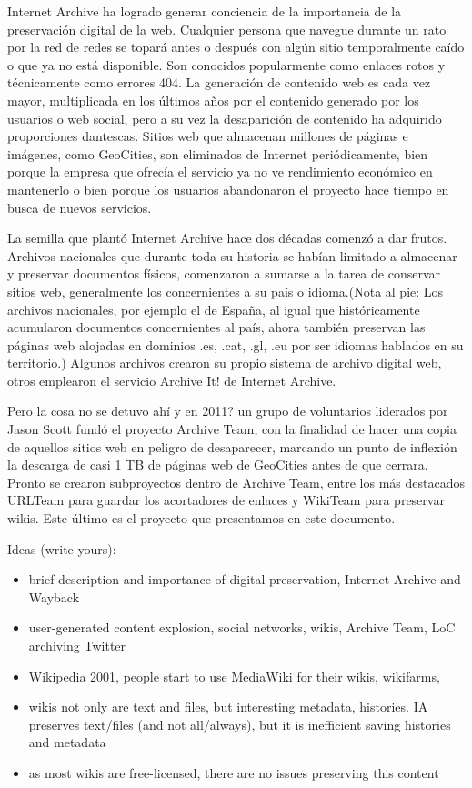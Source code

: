 \documentclass[11pt,twocolumn]{article}
\begin{document}
Internet Archive ha logrado generar conciencia de la importancia de la preservación digital de la web. Cualquier persona que navegue durante un rato por la red de redes se topará antes o después con algún sitio temporalmente caído o que ya no está disponible. Son conocidos popularmente como enlaces rotos y técnicamente como errores 404. La generación de contenido web es cada vez mayor, multiplicada en los últimos años por el contenido generado por los usuarios o web social, pero a su vez la desaparición de contenido ha adquirido proporciones dantescas. Sitios web que almacenan millones de páginas e imágenes, como GeoCities, son eliminados de Internet periódicamente, bien porque la empresa que ofrecía el servicio ya no ve rendimiento económico en mantenerlo o bien porque los usuarios abandonaron el proyecto hace tiempo en busca de nuevos servicios.

La semilla que plantó Internet Archive hace dos décadas comenzó a dar frutos. Archivos nacionales que durante toda su historia se habían limitado a almacenar y preservar documentos físicos, comenzaron a sumarse a la tarea de conservar sitios web, generalmente los concernientes a su país o idioma.(Nota al pie: Los archivos nacionales, por ejemplo el de España, al igual que históricamente  acumularon documentos concernientes al país, ahora también preservan las páginas web alojadas en dominios .es, .cat, .gl, .eu por ser idiomas hablados en su territorio.) Algunos archivos crearon su propio sistema de archivo digital web, otros emplearon el servicio Archive It! de Internet Archive.

Pero la cosa no se detuvo ahí y en 2011? un grupo de voluntarios liderados por Jason Scott fundó el proyecto Archive Team, con la finalidad de hacer una copia de aquellos sitios web en peligro de desaparecer, marcando un punto de inflexión la descarga de casi 1 TB de páginas web de GeoCities antes de que cerrara. Pronto se crearon subproyectos dentro de Archive Team, entre los más destacados URLTeam para guardar los acortadores de enlaces y WikiTeam para preservar wikis. Este último es el proyecto que presentamos en este documento.

Ideas (write yours):
\begin{itemize}
\item brief description and importance of digital preservation, Internet Archive and Wayback
\item user-generated content explosion, social networks, wikis, Archive Team, LoC archiving Twitter
\item Wikipedia 2001, people start to use MediaWiki for their wikis, wikifarms,
\item wikis not only are text and files, but interesting metadata, histories. IA preserves text/files (and not all/always), but it is inefficient saving histories and metadata
\item as most wikis are free-licensed, there are no issues preserving this content
\end{itemize}
\end{document}
